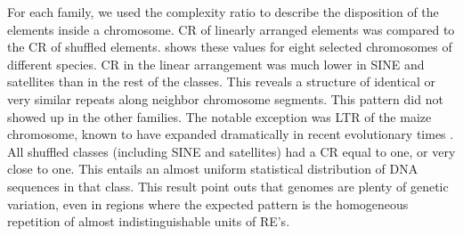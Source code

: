 For each family, we used the complexity ratio to describe the disposition of the elements inside a chromosome. CR of linearly arranged elements was compared to the CR of shuffled elements.  shows these values for eight selected chromosomes of different species. CR in the linear arrangement was much lower in SINE and satellites than in the rest of the classes. This reveals a structure of identical or very similar repeats along neighbor chromosome segments. This pattern did not showed up in the other families. The notable exception was LTR of the maize chromosome, known to have expanded dramatically in recent evolutionary times \cite{Blanc2004}. All shuffled classes (including SINE and satellites) had a CR equal to one, or very close to one. This entails an almost uniform statistical distribution of DNA sequences in that class. This result point outs that genomes are plenty of genetic variation, even in regions where the expected pattern is the homogeneous repetition of almost indistinguishable units of RE's.

